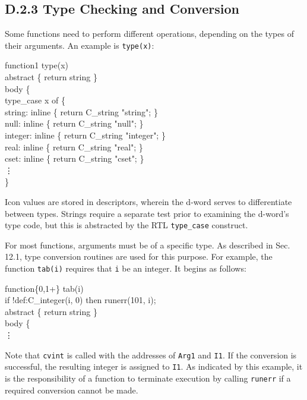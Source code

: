 \subsection[D.2.3 Type Checking and Conversion]{D.2.3 Type Checking and Conversion}

Some functions need to perform different operations, depending on the
types of their arguments. An example is \texttt{type(x)}:

\goodbreak
\begin{iconcode}
function{1} type(x)\\
abstract \{ return string \} \\
body \{\\
\>type\_case x of  \{\\
\>\>      string:   inline \{ return C\_string "string";    \} \\
\>\>      null:     inline \{ return C\_string "null";      \} \\
\>\>      integer:  inline \{ return C\_string "integer";   \} \\
\>\>      real:     inline \{ return C\_string "real";      \} \\
\>\>      cset:     inline \{ return C\_string "cset";      \} \\
\>\>      \vdots \\
\>\} \\
\end{iconcode}

\noindent
Icon values are stored in descriptors, wherein the d-word serves to
differentiate between types. Strings require a separate test prior
to examining the d-word's type code, but this is abstracted by the
RTL \texttt{type\_case} construct.

For most functions, arguments must be of a specific type. As described in
Sec. 12.1, type conversion routines are used for this purpose. For example,
the function \texttt{tab(i)} requires that \texttt{i} be an integer. It
begins as follows:

\goodbreak
\begin{iconcode}
function\{0,1+\} tab(i)\\
\>   if !def:C\_integer(i, 0) then runerr(101, i); \\
\>   abstract \{ return string \} \\
body \{\\
\> \vdots
\end{iconcode}

\noindent
Note that \texttt{cvint} is called with the addresses of \texttt{Arg1} and
\texttt{I1}. If the conversion is successful, the resulting integer is assigned
to \texttt{I1}. As indicated by this example, it is the responsibility of a
function to terminate execution by calling \texttt{runerr} if a required
conversion cannot be made.

